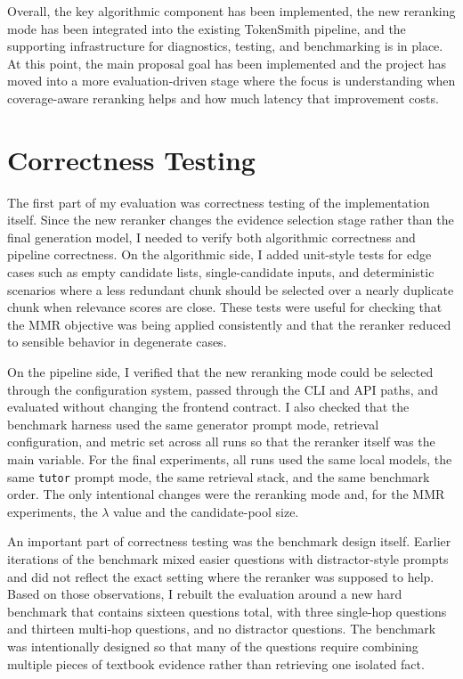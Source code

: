 \documentclass[sigconf]{acmart}
\begin{document}
Overall, the key algorithmic component has been implemented, the new reranking mode has been integrated into the existing TokenSmith pipeline, and the supporting infrastructure for diagnostics, testing, and benchmarking is in place. At this point, the main proposal goal has been implemented and the project has moved into a more evaluation-driven stage where the focus is understanding when coverage-aware reranking helps and how much latency that improvement costs.

\section{Correctness Testing}
The first part of my evaluation was correctness testing of the implementation itself. Since the new reranker changes the evidence selection stage rather than the final generation model, I needed to verify both algorithmic correctness and pipeline correctness. On the algorithmic side, I added unit-style tests for edge cases such as empty candidate lists, single-candidate inputs, and deterministic scenarios where a less redundant chunk should be selected over a nearly duplicate chunk when relevance scores are close. These tests were useful for checking that the MMR objective was being applied consistently and that the reranker reduced to sensible behavior in degenerate cases.

On the pipeline side, I verified that the new reranking mode could be selected through the configuration system, passed through the CLI and API paths, and evaluated without changing the frontend contract. I also checked that the benchmark harness used the same generator prompt mode, retrieval configuration, and metric set across all runs so that the reranker itself was the main variable. For the final experiments, all runs used the same local models, the same \texttt{tutor} prompt mode, the same retrieval stack, and the same benchmark order. The only intentional changes were the reranking mode and, for the MMR experiments, the \(\lambda\) value and the candidate-pool size.

An important part of correctness testing was the benchmark design itself. Earlier iterations of the benchmark mixed easier questions with distractor-style prompts and did not reflect the exact setting where the reranker was supposed to help. Based on those observations, I rebuilt the evaluation around a new hard benchmark that contains sixteen questions total, with three single-hop questions and thirteen multi-hop questions, and no distractor questions. The benchmark was intentionally designed so that many of the questions require combining multiple pieces of textbook evidence rather than retrieving one isolated fact.
\end{document}
